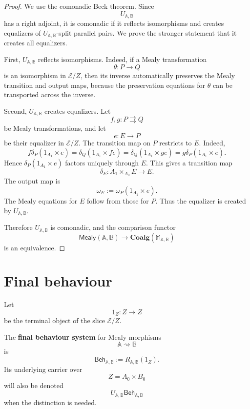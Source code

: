 \begin{proof}
We use the comonadic Beck theorem. Since
\[
U_{\mathbb A,\mathbb B}
\]
has a right adjoint, it is comonadic if it reflects isomorphisms and creates
equalizers of \(U_{\mathbb A,\mathbb B}\)-split parallel pairs. We prove the
stronger statement that it creates all equalizers.

First, \(U_{\mathbb A,\mathbb B}\) reflects isomorphisms. Indeed, if a Mealy
transformation
\[
\theta:P\to Q
\]
is an isomorphism in \(\mathcal E/Z\), then its inverse automatically
preserves the Mealy transition and output maps, because the preservation
equations for \(\theta\) can be transported across the inverse.

Second, \(U_{\mathbb A,\mathbb B}\) creates equalizers. Let
\[
f,g:P\rightrightarrows Q
\]
be Mealy transformations, and let
\[
e:E\to P
\]
be their equalizer in \(\mathcal E/Z\). The transition map on \(P\) restricts
to \(E\). Indeed,
\[
f\delta_P(1_{A_1}\times e)
=
\delta_Q(1_{A_1}\times fe)
=
\delta_Q(1_{A_1}\times ge)
=
g\delta_P(1_{A_1}\times e).
\]
Hence \(\delta_P(1_{A_1}\times e)\) factors uniquely through \(E\). This
gives a transition map
\[
\delta_E:
A_1\times_{A_0}E\to E.
\]
The output map is
\[
\omega_E:=\omega_P(1_{A_1}\times e).
\]
The Mealy equations for \(E\) follow from those for \(P\). Thus the equalizer
is created by \(U_{\mathbb A,\mathbb B}\).

Therefore \(U_{\mathbb A,\mathbb B}\) is comonadic, and the comparison
functor
\[
\mathsf{Mealy}(\mathbb A,\mathbb B)
\to
\mathbf{Coalg}(\mathbb M_{\mathbb A,\mathbb B})
\]
is an equivalence.
\end{proof}

\section{Final behaviour}
\label{sec:final-mealy-behaviour}

Let
\[
1_Z:Z\to Z
\]
be the terminal object of the slice \(\mathcal E/Z\).

\begin{definition}
\label{def:behaviour-object}
The \textbf{final behaviour system} for Mealy morphisms
\[
\mathbb A\rightsquigarrow\mathbb B
\]
is
\[
\mathsf{Beh}_{\mathbb A,\mathbb B}
:=
R_{\mathbb A,\mathbb B}(1_Z).
\]
Its underlying carrier over
\[
Z=A_0\times B_0
\]
will also be denoted
\[
U_{\mathbb A,\mathbb B}\mathsf{Beh}_{\mathbb A,\mathbb B}
\]
when the distinction is needed.
\end{definition}

